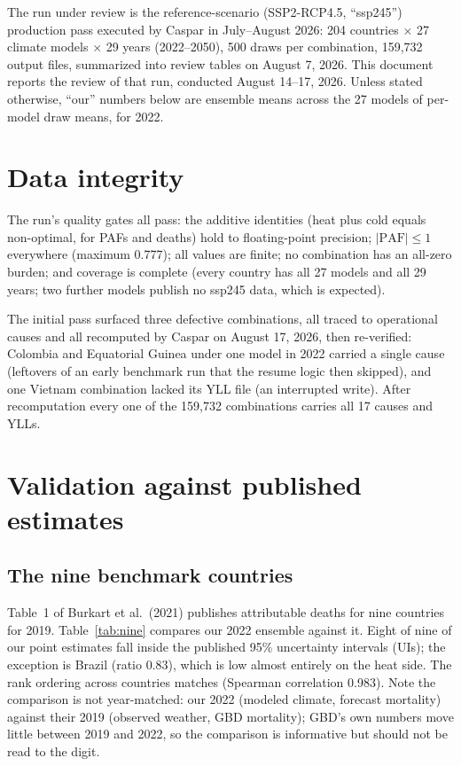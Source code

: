 \documentclass[11pt]{ozreport}
\begin{document}
The run under review is the reference-scenario (SSP2-RCP4.5, ``ssp245'')
production pass executed by Caspar in July--August 2026: 204 countries
$\times$ 27 climate models $\times$ 29 years (2022--2050), 500 draws per
combination, 159{,}732 output files, summarized into review tables on
August 7, 2026. This document reports the review of that run, conducted
August 14--17, 2026. Unless stated otherwise, ``our'' numbers below are
ensemble means across the 27 models of per-model draw means, for 2022.

\section{Data integrity}

The run's quality gates all pass: the additive identities (heat plus cold
equals non-optimal, for PAFs and deaths) hold to floating-point precision;
$|\mathrm{PAF}| \le 1$ everywhere (maximum 0.777); all values are finite; no
combination has an all-zero burden; and coverage is complete (every country
has all 27 models and all 29 years; two further models publish no ssp245
data, which is expected).

The initial pass surfaced three defective combinations, all traced to
operational causes and all recomputed by Caspar on August 17, 2026, then
re-verified: Colombia and Equatorial Guinea under one model in 2022 carried a
single cause (leftovers of an early benchmark run that the resume logic then
skipped), and one Vietnam combination lacked its YLL file (an interrupted
write). After recomputation every one of the 159{,}732 combinations carries
all 17 causes and YLLs.

\section{Validation against published estimates}

\subsection{The nine benchmark countries}

Table~1 of Burkart et al.\ (2021) publishes attributable deaths for nine
countries for 2019. Table~\ref{tab:nine} compares our 2022 ensemble against
it. Eight of nine of our point estimates fall inside the published 95\%
uncertainty intervals (UIs); the exception is Brazil (ratio 0.83), which is
low almost entirely on the heat side. The rank ordering across countries
matches (Spearman correlation 0.983). Note the comparison is not
year-matched: our 2022 (modeled climate, forecast mortality) against their
2019 (observed weather, GBD mortality); GBD's own numbers move little between
2019 and 2022, so the comparison is informative but should not be read to the
digit.
\end{document}
